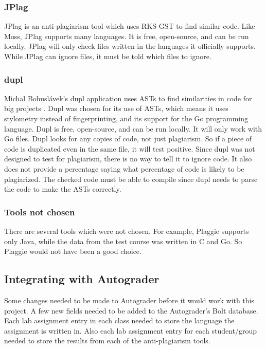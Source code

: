 \documentclass[10pt,journal,compsoc]{IEEEtran}
\begin{document}
			\subsubsection{JPlag}
			JPlag is an anti-plagiarism tool which uses RKS-GST to find similar code. Like Moss, JPlag supports many languages. It is free, open-source, and can be run locally. JPlag will only check files written in the languages it officially supports. While JPlag can ignore files, it must be told which files to ignore.
		
			\subsubsection{dupl}
			Michal Bohuslávek's dupl application uses ASTs to find similarities in code for big projects \cite{bohuslave}. Dupl was chosen for its use of ASTs, which means it uses stylometry instead of fingerprinting, and its support for the Go programming language. Dupl is free, open-source, and can be run locally. It will only work with Go files. Dupl looks for any copies of code, not just plagiarism. So if a piece of code is duplicated even in the same file, it will test positive. Since dupl was not designed to test for plagiarism, there is no way to tell it to ignore code. It also does not provide a percentage saying what percentage of code is likely to be plagiarized. The checked code must be able to compile since dupl needs to parse the code to make the ASTs correctly.
		
			\subsubsection{Tools not chosen}
			There are several tools which were not chosen. For example, Plaggie supports only Java, while the data from the test course was written in C and Go. So Plaggie would not have been a good choice.
		
		\subsection{Integrating with Autograder}
		Some changes needed to be made to Autograder before it would work with this project. A few new fields needed to be added to the Autograder's Bolt database. Each lab assignment entry in each class needed to store the language the assignment is written in. Also each lab assignment entry for each student/group needed to store the results from each of the anti-plagiarism tools.
		
\end{document}
